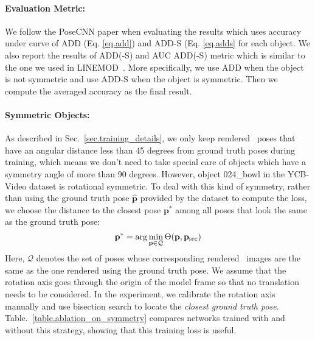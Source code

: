 \documentclass[twocolumn]{svjour3}
\newcommand{\rend}[0]{rendered}
\newcommand{\gtpose}[0]{\mathbf{\hat{p}}}
\begin{document}
\paragraph{Evaluation Metric:} We follow the PoseCNN \citep{xiang2017posecnn} paper when evaluating the results which uses accuracy under curve of ADD (Eq. \ref{eq.add}) and ADD-S (Eq. \ref{eq.adds} for each object. We also report the results of ADD(-S) and AUC ADD(-S) metric which is similar to the one we used in LINEMOD~\citep{Brachmann2014Learning6O}. More specifically, we use ADD when the object is not
symmetric
and use ADD-S when the object is
symmetric. Then we compute the averaged accuracy as the final result.

\paragraph{Symmetric Objects:} As described in Sec.~\ref{sec.training_details}, we only keep \rend~ poses that have an angular distance less than 45 degrees from ground truth poses during training, which means we don't need to take special care of objects which have a symmetry angle of more than 90 degrees. However, object 024\_bowl in the YCB-Video dataset is
rotational
symmetric. To deal with this kind of symmetry, rather than using the ground truth pose $\gtpose$ provided by the dataset to compute the loss, we choose the distance to the closest pose $\mathbf{p}^*$ among all poses that look the same as the ground truth pose:
\begin{equation}
\centering
    \mathbf{p}^*=\arg\min_{\mathbf{p}\in \mathcal{Q}}\Theta(\mathbf{p}, \mathbf{p}_\text{src})
\end{equation}
Here, $\mathcal{Q}$ denotes the set of poses whose corresponding \rend~ images are the same as the one rendered using the ground truth pose. We assume that the rotation axis goes through the origin of the model frame so that no translation needs to be considered. In the experiment, we calibrate the rotation axis manually and use bisection search to locate the \textit{closest ground truth pose}. Table.~\ref{table.ablation_on_symmetry} compares networks trained with and without this strategy, showing that this training loss is useful.
\end{document}
